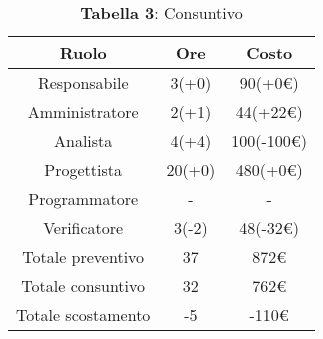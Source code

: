 \begin{table}[H]
	\centering
	\renewcommand{\arraystretch}{1.5}
	\begin{tabular}{|c|c|c|}
		\hline
		\rowcolor{lighter-grayer}
		Ruolo & Ore & Costo \\ \hline
		Responsabile & 3(+0) & 90(+0\euro) \\ \hline
		Amministratore & 2(+1) & 44(+22\euro) \\ \hline
		Analista & 4(+4) & 100(-100\euro) \\ \hline
		Progettista & 20(+0) & 480(+0\euro) \\ \hline
		Programmatore & - & - \\ \hline
		Verificatore & 3(-2) & 48(-32\euro) \\ \hline
		Totale preventivo & 37 & 872\euro \\ \hline
		Totale consuntivo & 32 & 762\euro \\ \hline
		Totale scostamento & -5 & -110\euro \\ \hline
	\end{tabular}
	\caption*{\textbf{Tabella 3}: Consuntivo\\}
\end{table}

